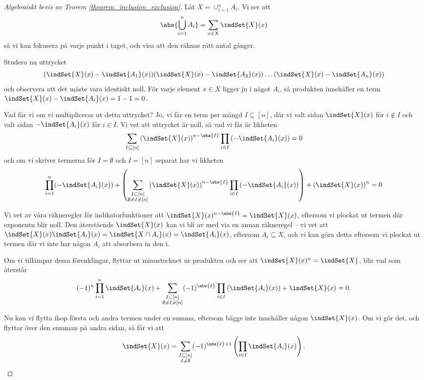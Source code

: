 \documentclass[nobib]{tufte-handout}
\begin{document}
\begin{proof}[Algebraiskt bevis av Teorem \ref{theorem_inclusion_exclusion}]
  Låt $X = \cup_{i=1}^n A_i$. Vi ser att
  $$\abs{\bigcup_{i=1}^n A_i} = \sum_{x \in X} \indSet{X}(x)$$
  så vi kan fokusera på varje punkt i taget, och visa att den räknas rätt antal gånger.

  Studera nu uttrycket
  $$(\indSet{X}(x) - \indSet{A_1}(x))(\indSet{X}(x) - \indSet{A_2}(x))\ldots(\indSet{X}(x) - \indSet{A_n}(x))$$
  och observera att det måste vara identiskt noll. För varje element $x\in X$ ligger ju i något $A_i$, så produkten innehåller en term $\indSet{X}(x) - \indSet{A_i}(x) = 1 - 1 = 0$.

  Vad får vi om vi multiplicerar ut detta uttrycket? Jo, vi får en term per mängd $I \subseteq [n]$, där vi valt sidan $\indSet{X}(x)$ för $i\not\in I$ och valt sidan $-\indSet{A_i}(x)$ för $i \in I$. Vi vet att uttrycket är noll, så vad vi får är likheten
  $$\sum_{I \subseteq [n]} \left(\indSet{X}(x)\right)^{n - \abs{I}}\prod_{i\in I}\left(-\indSet{A_i}(x)\right) = 0$$
  och om vi skriver termerna för $I = \emptyset$ och $I = [n]$ separat har vi likheten
  $$\prod_{i=1}^{n} (-\indSet{A_i}(x)) + \left(\sum_{\substack{I \subset [n]\\\emptyset \neq I \neq [n]}} \left(\indSet{X}(x)\right)^{n - \abs{I}}\prod_{i\in I}\left(-\indSet{A_i}(x)\right)\right) + \left(\indSet{X}(x)\right)^n = 0$$

  Vi vet av våra räkneregler för indikatorfunktioner att $\indSet{X}(x)^{n-\abs{I}} = \indSet{X}(x)$, eftersom vi plockat ut termen där exponentn blir noll. Den återstående $\indSet{X}(x)$ kan vi bli av med via en annan räkneregel -- vi vet att $\indSet{X}(x)\indSet{A_i}(x) = \indSet{X \cap A_i}(x) = \indSet{A_i}(x)$, eftersom $A_i \subseteq X$, och vi kan göra detta eftersom vi plockat ut termen där vi inte har någon $A_i$ att absorbera in den i. 
  
  Om vi tillämpar dessa förenklingar, flyttar ut minustecknet ur produkten och ser att $\indSet{X}(x)^n = \indSet{X}$, blir vad som återstår
  $$(-1)^n\prod_{i=1}^{n} \indSet{A_i}(x) + \sum_{\substack{I \subset [n]\\\emptyset \neq I \neq [n]}} (-1)^{\abs{I}}\prod_{i\in I}\left(\indSet{A_i}(x)\right) + \indSet{X}(x) = 0.$$
  
  Nu kan vi flytta ihop första och andra termen under en summa, eftersom bägge inte innehåller någon $\indSet{X}(x)$. Om vi gör det, och flyttar över den summan på andra sidan, så får vi att
  $$\indSet{X}(x) = \sum_{\substack{I \subseteq [n]\\I \neq \emptyset}} (-1)^{\abs{I} + 1}\left(\prod_{i\in I} \indSet{A_i}(x)\right).$$


\end{proof}
\end{document}
